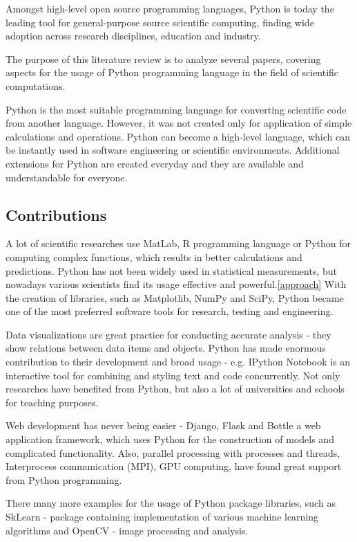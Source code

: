 %
%
Amongst high-level open source programming languages, Python is today the leading tool for general-purpose source scientific computing, finding wide adoption across research disciplines, education and industry.

The purpose of this literature review is to analyze several papers, covering aspects for the usage of Python programming language in the field of scientific computations. 

Python is the most suitable programming language for converting scientific code from another language. However, it was not created only for application of simple calculations and operations. Python can become a high-level language, which can be instantly used in software engineering or scientific environments. Additional extensions for Python are created everyday and they are available and understandable for everyone.

\subsection*{Contributions}
A lot of scientific researches use MatLab, R programming language or Python for computing complex functions, which results in better calculations and predictions. Python has not been widely used in statistical measurements, but nowadays various scientists find its usage effective and powerful.\ref{approach} With the creation of libraries, such as Matplotlib, NumPy and SciPy, Python became one of the most preferred software tools for research, testing and engineering. 

Data visualizations are great practice for conducting accurate analysis - they show relations between data items and objects. Python has made enormous contribution to their development and broad usage - e.g. IPython Notebook is an interactive tool for combining and styling text and code concurrently. Not only researches have benefited from Python, but also a lot of universities and schools for teaching purposes.

Web development has never being easier - Django, Flask and Bottle a web application framework, which uses Python for the construction of models and complicated functionality. Also, parallel processing with processes and threads, Interprocess communication (MPI), GPU computing, have found great support from Python programming.

There many more examples for the usage of Python package libraries, such as SkLearn - package containing implementation of various machine learning algorithms and OpenCV - image processing and analysis. 

